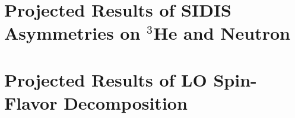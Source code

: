 \documentclass[11pt]{report}
\begin{document}
\chapter{Projected Results of SIDIS Asymmetries on $^3$He and Neutron}
\chapter{Projected Results of LO Spin-Flavor Decomposition}
\label{App:spin_flavor}
 

%
%
%
\clearpage
{}
{}

%
%
%


{}


\end{document}
